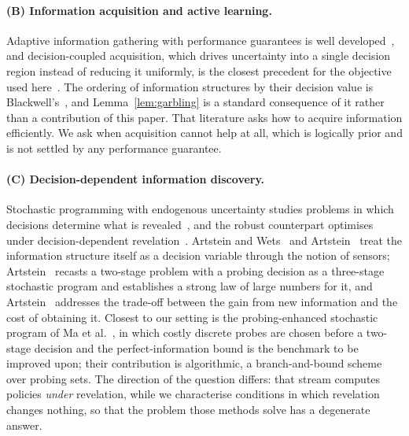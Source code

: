 \documentclass[pdflatex,sn-mathphys-num]{sn-jnl}
\theoremstyle{thmstyleone}
\theoremstyle{thmstyletwo}
\theoremstyle{thmstylethree}
\begin{document}
\paragraph{(B) Information acquisition and active learning.} Adaptive
information gathering with performance guarantees is well
developed~\cite{golovin2011}, and decision-coupled acquisition, which drives
uncertainty into a single decision region instead of reducing it uniformly,
is the closest precedent for the objective used here~\cite{javdani2014}. The ordering of information structures by their
decision value is Blackwell's~\cite{blackwell1953}, and
Lemma~\ref{lem:garbling} is a standard consequence of it rather than a
contribution of this paper. That literature asks how to acquire information
efficiently. We ask when acquisition cannot help at all, which is logically
prior and is not settled by any performance guarantee.

\paragraph{(C) Decision-dependent information discovery.} Stochastic
programming with endogenous uncertainty studies problems in which decisions
determine what is revealed~\cite{jonsbraten1998,goel2006}, and the robust
counterpart optimises under decision-dependent
revelation~\cite{vayanos2025}. Artstein and Wets~\cite{artstein1993} and
Artstein~\cite{artstein1994,artstein1999} treat the information structure
itself as a decision variable through the notion of sensors;
Artstein~\cite{artstein1994} recasts a two-stage problem with a probing
decision as a three-stage stochastic program and establishes a strong law of
large numbers for it, and Artstein~\cite{artstein1999} addresses the
trade-off between the gain from new information and the cost of obtaining
it. Closest to our setting is the probing-enhanced
stochastic program of Ma et al.~\cite{ma2024}, in which costly discrete
probes are chosen before a two-stage decision and the perfect-information
bound is the benchmark to be improved upon; their contribution is
algorithmic, a branch-and-bound scheme over probing sets. The direction of the question differs: that stream computes policies
\emph{under} revelation, while we characterise conditions in which revelation
changes nothing, so that the
problem those methods solve has a degenerate answer.
\end{document}

